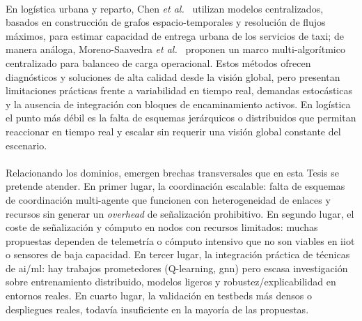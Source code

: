 \\
En logística urbana y reparto, Chen \textit{et al.}~\cite{Chen21taxi} utilizan modelos centralizados, basados en construcción de grafos espacio-temporales y resolución de flujos máximos, para estimar capacidad de entrega urbana de los servicios de taxi; de manera análoga, Moreno-Saavedra \textit{et al.}~\cite{moreno2024multi} proponen un marco multi-algorítmico centralizado para balanceo de carga operacional. Estos métodos ofrecen diagnósticos y soluciones de alta calidad desde la visión global, pero presentan limitaciones prácticas frente a variabilidad en tiempo real, demandas estocásticas y la ausencia de integración con bloques de encaminamiento activos. En logística el punto más débil es la falta de esquemas jerárquicos o distribuidos que permitan reaccionar en tiempo real y escalar sin requerir una visión global constante del escenario.\\
\\
Relacionando los dominios, emergen brechas transversales que en esta Tesis se pretende atender. En primer lugar, la coordinación escalable: falta de esquemas de coordinación multi-agente que funcionen con heterogeneidad de enlaces y recursos sin generar un \textit{overhead} de señalización prohibitivo. En segundo lugar, el coste de señalización y cómputo en nodos con recursos limitados: muchas propuestas dependen de telemetría o cómputo intensivo que no son viables en \gls{iiot} o sensores de baja capacidad. En tercer lugar, la integración práctica de técnicas de \gls{ai}/\gls{ml}: hay trabajos prometedores (Q-learning, \gls{gnn}) pero escasa investigación sobre entrenamiento distribuido, modelos ligeros y robustez/explicabilidad en entornos reales. En cuarto lugar, la validación en testbeds más densos o despliegues reales, todavía insuficiente en la mayoría de las propuestas.

